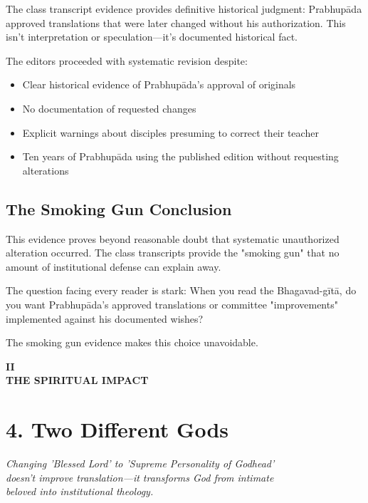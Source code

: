 \documentclass[11pt,twoside]{book}
\makeatletter
\def\cleardoublepage{\clearpage\if@twoside \ifodd\c@page\else\hbox{}\thispagestyle{empty}\newpage\if@twocolumn\hbox{}\newpage\fi\fi\fi}
\makeatother
\begin{document}
The class transcript evidence provides definitive historical judgment: Prabhupāda approved translations that were later changed without his authorization. This isn't interpretation or speculation—it's documented historical fact.

The editors proceeded with systematic revision despite:
\begin{itemize}
\item Clear historical evidence of Prabhupāda's approval of originals
\item No documentation of requested changes
\item Explicit warnings about disciples presuming to correct their teacher
\item Ten years of Prabhupāda using the published edition without requesting alterations
\end{itemize}
\section*{The Smoking Gun Conclusion}
\label{sec:orged9e258}

This evidence proves beyond reasonable doubt that systematic unauthorized alteration occurred. The class transcripts provide the "smoking gun" that no amount of institutional defense can explain away.

The question facing every reader is stark: When you read the Bhagavad-gītā, do you want Prabhupāda's approved translations or committee "improvements" implemented against his documented wishes?

The smoking gun evidence makes this choice unavoidable.

\cleardoublepage
\thispagestyle{empty}
\vspace*{0.25\textheight}
\begin{center}
{\Huge\bfseries\MakeUppercase{\textbf{II}}}\\[0.5cm]
{\huge\bfseries THE SPIRITUAL IMPACT}
\end{center}
\vspace*{\fill}
\clearpage
\thispagestyle{empty} %
\mbox{}
\newpage
\chapter*{4. Two Different Gods}
\label{sec:org352be44}

{\centering\itshape Changing 'Blessed Lord' to 'Supreme Personality of Godhead'\\doesn't improve translation—it transforms God from intimate\\beloved into institutional theology.\par}
\vspace{0.3cm}
\end{document}
